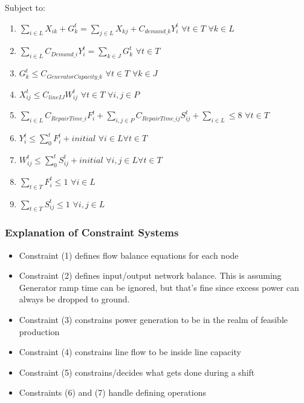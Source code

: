 \documentclass{article}
\begin{document}
	Subject to:
	\begin{enumerate}[label=(\arabic*), leftmargin=*, itemsep=0.4ex, before={\everymath{\displaystyle}}]%
		
		\item $\sum_{i \in L} X_{ik}+G_{k}^{t} = \sum_{j \in L} X_{kj}+C_{demand\_k}Y_i^t \hspace{4pt} \forall t \in T \hspace{4pt} \forall k \in L$ 
		\item $\sum_{i \in L} C_{Demand\_i}Y_i^t = \sum_{k \in J} G_k^t \hspace{4pt} \forall t \in T$
		\item $G_k^t \leq C_{GeneratorCapacity\_k} \hspace{4pt} \forall t\in T \hspace{4pt} \forall k \in J$
		\item $X_{ij}^t \leq C_{lineIJ}W_{ij}^t \hspace{4pt} \forall t \in T \hspace{4pt} \forall i,j \in P$
		\item $\sum_{i \in L} C_{RepairTime\_i} F_{i}^t +\sum_{i,j \in P} C_{RepairTime\_ij} S_{ij}^t + \sum_{i \in L}  \leq 8 \hspace{4pt} \forall t \in T \hspace{4pt}$
		\item $Y_i^t \leq \sum_{0}^{t} F_i^t+initial \hspace{4pt} \forall i \in L\forall t \in T$ 
		\item $W_{ij}^t \leq \sum_{0}^{t} S_{ij}^t+initial \hspace{4pt} \forall i,j \in L\forall t \in T $
		\item $\sum_{t \in T}F_i^t \leq 1\hspace{4pt} \forall i \in L$
		\item $\sum_{t \in T}S_{ij}^t \leq 1\hspace{4pt} \forall i,j \in L$
		
	\end{enumerate}
	\subsubsection{Explanation of Constraint Systems}
	\begin{itemize}
		\item Constraint (1) defines flow balance equations for each node
		\item Constraint (2) defines input/output network balance. This is assuming Generator ramp time can be ignored, but that's fine since excess power can always be dropped to ground.
		\item Constraint (3) constrains power generation to be in the realm of feasible production
		\item Constraint (4) constrains line flow to be inside line capacity
		\item Constraint (5) constrains/decides what gets done during a shift
		\item Constraints (6) and (7) handle defining operations
		\end{itemize}
\end{document}
